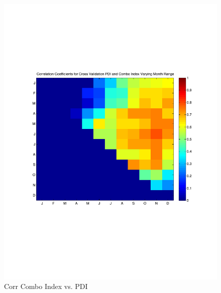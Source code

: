 \documentclass[]{article}
\begin{document}
\begin{figure}[ht]
\begin{minipage}[b]{0.6\linewidth}
\includegraphics[width=\textwidth]{figures/comboIndex/crossValidation/monthlySensitivityTestPDI.pdf}
\caption{Corr Combo Index vs. PDI}
\label{fig:figure40}
\end{minipage}
\end{figure}
\end{document}
